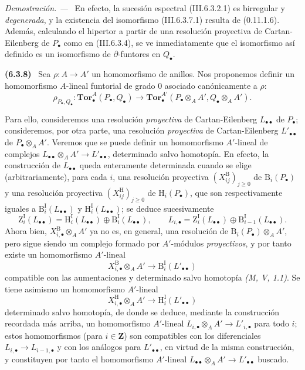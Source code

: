 \documentclass[10pt,oneside]{book}
\newcommand{\sref}[2][]{\textup{(#2)}}
\newcommand{\oldpage}[2][]{\setcounter{footnote}{0}\marginpar{\scriptsize\textbf{#1}~|~#2}\ignorespaces}
\newenvironment{env}[1][]{\par\medskip\noindent\textbf{(#1)}\ }{\par}
\newenvironment{proof}{\par\medskip\noindent\textit{Demostración. ---\ }}{\par}
\begin{document}
\begin{proof}
En efecto, la sucesión espectral \sref{III.6.3.2.1} es birregular y
\emph{degenerada}, y la existencia del isomorfismo \sref{III.6.3.7.1} resulta de
\sref[0]{0.11.1.6}. Además,
calculando el hipertor a partir de una resolución proyectiva de
Cartan-Eilenberg de $P_\bullet$ como en \sref{III.6.3.4}, se ve
inmediatamente que el
isomorfismo así definido es un isomorfismo de $\partial$-funtores en
$Q_\bullet$.
\end{proof}
\begin{env}[6.3.8]
\label{III.6.3.8}
\oldpage[III]{144}
Sea $\rho:A\to A'$ un homomorfismo de anillos. Nos proponemos definir un
homomorfismo $A$-lineal funtorial de grado 0 asociado canónicamente a $\rho$:
\[
  \rho_{P_\bullet,Q_\bullet}:
  \mathbf{Tor}_\bullet^A(P_\bullet,Q_\bullet)
  \longrightarrow
  \mathbf{Tor}_\bullet^{A'}
  (P_\bullet\otimes_A A',Q_\bullet\otimes_A A').
  \tag{6.3.8.1}\label{III.6.3.8.1}
\]

Para ello, consideremos una resolución \emph{proyectiva} de Cartan-Eilenberg
$L_{\bullet\bullet}$ de $P_\bullet$; consideremos, por otra parte, una
resolución \emph{proyectiva} de Cartan-Eilenberg $L'_{\bullet\bullet}$ de
$P_\bullet\otimes_A A'$. Veremos que se puede definir un
homomorfismo $A'$-lineal de complejos
$L_{\bullet\bullet}\otimes_A A'\to L'_{\bullet\bullet}$, determinado salvo
homotopía. En efecto, la construcción de $L_{\bullet\bullet}$ queda
enteramente determinada cuando se elige (arbitrariamente), para cada $i$,
una resolución proyectiva $(X_{ij}^{\mathrm B})_{j\geqslant0}$ de
$\mathrm B_i(P_\bullet)$ y una resolución proyectiva
$(X_{ij}^{\mathrm H})_{j\geqslant0}$ de $\mathrm H_i(P_\bullet)$, que son
respectivamente iguales a $\mathrm B_i^{\mathrm I}(L_{\bullet\bullet})$ y
$\mathrm H_i^{\mathrm I}(L_{\bullet\bullet})$; se deduce sucesivamente
\[
  \mathrm Z_i^{\mathrm I}(L_{\bullet\bullet})
  =\mathrm H_i^{\mathrm I}(L_{\bullet\bullet})
   \oplus\mathrm B_i^{\mathrm I}(L_{\bullet\bullet}),
  \qquad
  L_{i,\bullet}=\mathrm Z_i^{\mathrm I}(L_{\bullet\bullet})
   \oplus\mathrm B_{i-1}^{\mathrm I}(L_{\bullet\bullet}).
\]
Ahora bien, $X_{i,\bullet}^{\mathrm B}\otimes_A A'$ ya no es, en general,
una resolución de $\mathrm B_i(P_\bullet)\otimes_A A'$, pero sigue siendo un
complejo formado por $A'$-módulos \emph{proyectivos}, y por tanto existe un
homomorfismo $A'$-lineal
\[
  X_{i,\bullet}^{\mathrm B}\otimes_A A'
  \longrightarrow \mathrm B_i^{\mathrm I}(L'_{\bullet\bullet})
\]
compatible con las aumentaciones y determinado salvo homotopía
\emph{(M, V, 1.1)}. Se tiene asimismo un homomorfismo $A'$-lineal
\[
  X_{i,\bullet}^{\mathrm H}\otimes_A A'
  \longrightarrow \mathrm H_i^{\mathrm I}(L'_{\bullet\bullet})
\]
determinado salvo homotopía, de donde se deduce, mediante la construcción
recordada más arriba, un homomorfismo $A'$-lineal
$L_{i,\bullet}\otimes_A A'\to L'_{i,\bullet}$ para todo $i$; estos
homomorfismos (para $i\in\mathbf Z$) son compatibles con los diferenciales
$L_{i,\bullet}\to L_{i-1,\bullet}$ y con los análogos para
$L'_{\bullet\bullet}$, en virtud de la misma construcción, y constituyen por
tanto el homomorfismo $A'$-lineal
$L_{\bullet\bullet}\otimes_A A'\to L'_{\bullet\bullet}$ buscado.


\end{env}
\end{document}

